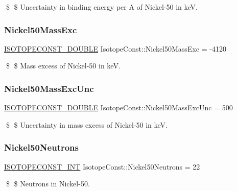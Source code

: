\$ \$ Uncertainty in binding energy per A of Nickel-\/50 in keV. \mbox{\label{group___isotope_const-_nickel-_ni50_ga7ff9041b26046959209d3bc258a2732d}} 
\subsubsection{\texorpdfstring{Nickel50\+Mass\+Exc}{Nickel50MassExc}}
{\footnotesize\ttfamily \mbox{\hyperlink{group___isotope_const-_macros_ga8f45a7272ce02c0b4c65c44636ed719a}{I\+S\+O\+T\+O\+P\+E\+C\+O\+N\+S\+T\+\_\+\+D\+O\+U\+B\+LE}} Isotope\+Const\+::\+Nickel50\+Mass\+Exc = -\/4120}

\$ \$ Mass excess of Nickel-\/50 in keV. \mbox{\label{group___isotope_const-_nickel-_ni50_ga21b285149249d200c9c36752b3e6b9a2}} 
\subsubsection{\texorpdfstring{Nickel50\+Mass\+Exc\+Unc}{Nickel50MassExcUnc}}
{\footnotesize\ttfamily \mbox{\hyperlink{group___isotope_const-_macros_ga8f45a7272ce02c0b4c65c44636ed719a}{I\+S\+O\+T\+O\+P\+E\+C\+O\+N\+S\+T\+\_\+\+D\+O\+U\+B\+LE}} Isotope\+Const\+::\+Nickel50\+Mass\+Exc\+Unc = 500}

\$ \$ Uncertainty in mass excess of Nickel-\/50 in keV. \mbox{\label{group___isotope_const-_nickel-_ni50_gaec70dfb5d4676bb4db97fd1f1ceaf643}} 
\subsubsection{\texorpdfstring{Nickel50\+Neutrons}{Nickel50Neutrons}}
{\footnotesize\ttfamily \mbox{\hyperlink{group___isotope_const-_macros_ga5f18360b3e99483a35c32d789e62621c}{I\+S\+O\+T\+O\+P\+E\+C\+O\+N\+S\+T\+\_\+\+I\+NT}} Isotope\+Const\+::\+Nickel50\+Neutrons = 22}

\$ \$ Neutrons in Nickel-\/50. \mbox{\label{group___isotope_const-_nickel-_ni50_gac410a1a03f15515b448653541a03f7f9}} 
